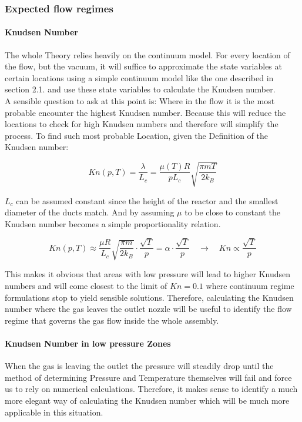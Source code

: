 \subsubsection{Expected flow regimes}

\paragraph{Knudsen Number}
	The whole Theory relies heavily on the continuum model.
	For every location of the flow, but the vacuum, it will suffice to approximate the state variables at certain locations using a simple continuum model like the one described in section 2.1.
	  and use these state variables to calculate the Knudsen number.\\

	A sensible question to ask at this point is: Where in the flow it is the most probable encounter the highest Knudsen number.
	Because this will reduce the locations to check for high Knudsen numbers and therefore will simplify the process.
	To find such most probable Location, given the Definition of the Knudsen number:

	$$
	Kn(p,T) = \frac{\lambda}{L_c} = \frac{\mu(T)R}{pL_c}\sqrt{\frac{\pi m T}{2k_B}}
	$$

	$L_c$ can be assumed constant since the height of the reactor and the smallest diameter of the ducts match.
	And by assuming $\mu$ to be close to constant the Knudsen number becomes a simple proportionality relation.

	$$
	Kn(p,T)\approx\frac{\mu R}{L_c}\sqrt{\frac{\pi m}{2k_B}}\cdot\frac{\sqrt{T}}{p}=\alpha\cdot\frac{\sqrt{T}}{p}\quad\rightarrow\quad Kn\propto \frac{\sqrt{T}}{p}
	$$

	This makes it obvious that areas with low pressure will lead to higher Knudsen numbers and will come closest to the limit of $Kn=0.1$ where continuum regime formulations stop to yield sensible solutions.
	Therefore, calculating the Knudsen number where the gas leaves the outlet nozzle will be useful to identify the flow regime that governs the gas flow inside the whole assembly.

\paragraph{Knudsen Number in low pressure Zones}

	When the gas is leaving the outlet the pressure will steadily drop until the method of determining Pressure and Temperature themselves will fail and force us to rely on numerical calculations.
	Therefore, it makes sense to identify a much more elegant way of calculating the Knudsen number which will be much more applicable in this situation.

